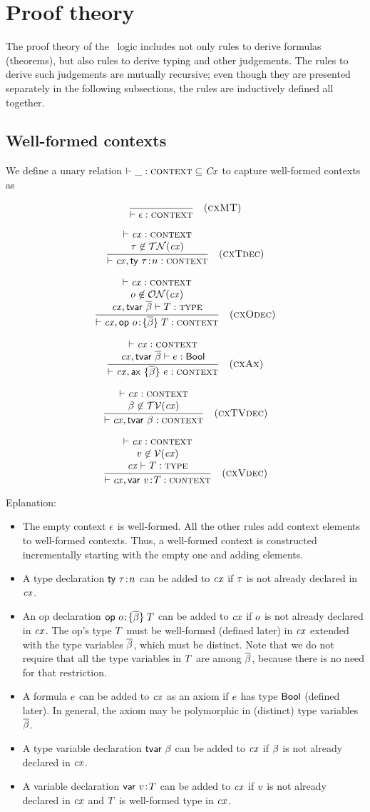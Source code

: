 \section{Proof theory}
\label{proofth}

The proof theory of the \MS\ logic includes not only rules to derive formulas
(theorems), but also rules to derive typing and other judgements. The rules to
derive such judgements are mutually recursive; even though they are presented
separately in the following subsections, the rules are inductively defined all
together.

\subsection{Well-formed contexts}
\label{wfcx-rules}

We define a unary relation $\vdash\_:\textsc{context}\subseteq\mathit{Cx}$ to capture well-formed
contexts as

\[
\frac{\begin{array}{c}\end{array}}{\vdash\epsilon:\textsc{context}}\quad\mbox{(\textsc{cxMT})}
\]

\[
\frac{\begin{array}{c}\vdash\mathit{cx}:\textsc{context}\\\tau\not\in\mathcal{TN}(\mathit{cx})\end{array}}{\vdash\mathit{cx},\mathsf{ty}\ \tau\!:\!n:\textsc{context}}\quad\mbox{(\textsc{cxTdec})}
\]

\[
\frac{\begin{array}{c}\vdash\mathit{cx}:\textsc{context}\\o\not\in\mathcal{ON}(\mathit{cx})\\\mathit{cx},\mathsf{tvar}\ \overline{\beta}\vdash T:\textsc{type}\end{array}}{\vdash\mathit{cx},\mathsf{op}\ o\!:\!\{\overline{\beta}\}\;T:\textsc{context}}\quad\mbox{(\textsc{cxOdec})}
\]

\[
\frac{\begin{array}{c}\vdash\mathit{cx}:\textsc{context}\\\mathit{cx},\mathsf{tvar}\ \overline{\beta}\vdash e:\mathsf{Bool}\end{array}}{\vdash\mathit{cx},\mathsf{ax}\ \{\overline{\beta}\}\ e:\textsc{context}}\quad\mbox{(\textsc{cxAx})}
\]

\[
\frac{\begin{array}{c}\vdash\mathit{cx}:\textsc{context}\\\beta\not\in\mathcal{TV}(\mathit{cx})\end{array}}{\vdash\mathit{cx},\mathsf{tvar}\ \beta:\textsc{context}}\quad\mbox{(\textsc{cxTVdec})}
\]

\[
\frac{\begin{array}{c}\vdash\mathit{cx}:\textsc{context}\\v\not\in\mathcal{V}(\mathit{cx})\\\mathit{cx}\vdash T:\textsc{type}\end{array}}{\vdash\mathit{cx},\mathsf{var}\ v\!:\!T:\textsc{context}}\quad\mbox{(\textsc{cxVdec})}
\]

Eplanation:
\begin{itemize}
\item
The empty context $\epsilon$ is well-formed. All the other rules add context
elements to well-formed contexts. Thus, a well-formed context is constructed
incrementally starting with the empty one and adding elements.
\item
A type declaration $\mathsf{ty}\ \tau\!:\!n$ can be added to $\mathit{cx}$ if $\tau$ is not already
declared in $\mathit{cx}$.
\item
An op declaration $\mathsf{op}\ o\!:\!\{\overline{\beta}\}\;T$ can be added to $\mathit{cx}$ if $o$ is not already
declared in $\mathit{cx}$. The op's type $T$ must be well-formed (defined later) in
$\mathit{cx}$ extended with the type variables $\overline{\beta}$, which must be distinct. Note
that we do not require that all the type variables in $T$ are among $\overline{\beta}$,
because there is no need for that restriction.
\item
A formula $e$ can be added to $\mathit{cx}$ as an axiom if $e$ has type $\mathsf{Bool}$
(defined later). In general, the axiom may be polymorphic in (distinct) type
variables $\overline{\beta}$.
\item
A type variable declaration $\mathsf{tvar}\ \beta$ can be added to $\mathit{cx}$ if $\beta$ is not
already declared in $\mathit{cx}$.
\item
A variable declaration $\mathsf{var}\ v\!:\!T$ can be added to $\mathit{cx}$ if $v$ is not already
declared in $\mathit{cx}$ and $T$ is well-formed type in $\mathit{cx}$.
\end{itemize}

